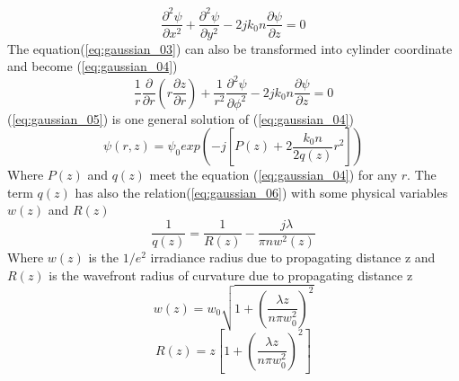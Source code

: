\begin{equation}
\frac{ \partial ^{2}\psi}{\partial x^2}+\frac{\partial ^{2}\psi}{\partial y^2}-2jk_{0}n\frac{\partial\psi}{\partial z}=0
\label{eq:gaussian_03}
\end{equation}
The equation(\ref{eq:gaussian_03}) can also be transformed into cylinder coordinate and become (\ref{eq:gaussian_04})
\begin{equation}
\frac{1}{r}\frac{\partial}{\partial r}\left(r\frac{\partial z}{\partial r}\right)+\frac{1}{r^2}\frac{ \partial ^{2}\psi}{\partial \phi^2}-2jk_{0}n\frac{\partial\psi}{\partial z}=0
\label{eq:gaussian_04}
\end{equation}
(\ref{eq:gaussian_05}) is one general solution of (\ref{eq:gaussian_04})
\begin{equation}
\psi(r,z)=\psi_{0}exp\left(-j\left[P(z)+2 \frac{ k_{0}n}{2q(z)}r^2\right]\right)
\label{eq:gaussian_05}
\end{equation}
Where $P(z)$ and $q(z)$ meet the equation (\ref{eq:gaussian_04}) for any $r$. The term $q(z)$ has also the relation(\ref{eq:gaussian_06}) with some physical variables $w(z)$ and $R(z)$
\begin{equation}
\frac{1}{q(z)}=\frac{1}{R(z)}-\frac{j\lambda}{\pi nw^{2}(z)}
\label{eq:gaussian_06}
\end{equation}
Where $w(z)$ is the $1/e^2$ irradiance radius due to propagating distance z and $R(z)$ is the wavefront radius of curvature due to propagating distance z
\begin{equation}
w(z)=w_{0}\sqrt{1+(\frac{\lambda z}{n\pi w^{2}_{0}})^{2}}
\label{eq:gaussian_07}
\end{equation}
\begin{equation}
R(z)=z\left[1+(\frac{\lambda z}{n\pi w^{2}_{0}})^{2}\right]
\label{eq:gaussian_08}
\end{equation}

